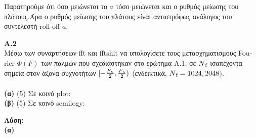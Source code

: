 \begin{justify}
    Παρατηρούμε ότι όσο μειώνεται το $a$ τόσο μειώνεται και ο ρυθμός μείωσης του πλάτους.Άρα
    ο ρυθμός μείωσης του πλάτους είναι αντιστρόφως ανάλογος του συντελεστή \textlatin{roll-off} $a$.
\end{justify}


\vspace{0.5cm}

\begin{justify}
    {\bf  Α.2}\\
    Μέσω των συναρτήσεων \textlatin{fft} και \textlatin{fftshit}
    να υπολογίσετε τους μετασχηματισμους \textlatin{Fourier} $\Phi(F)$ 
    των παλμών που σχεδιάστηκαν στο ερώτημα Α.1,
    σε $N\textsubscript{f}$ ισαπέχοντα σημεία στον άξονα συχνοτήτων 
    $[-\frac{F\textsubscript{s}}{2},\frac{F\textsubscript{s}}{2})$ (ενδεικτικά, $N\textsubscript{f}=1024,2048$).\\\\
    {\bf (α)} (5) Σε κοινό \textlatin{plot}:\\
    {\bf (β)} (5) Σε κοινό \textlatin{semilogy}:
\end{justify}

\newpage

\begin{justify}
    \textbf{Λύση:}\\
    \textbf{(α)}
\end{justify}


